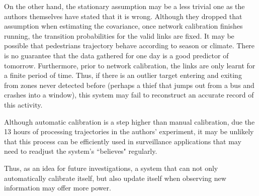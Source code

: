 \documentclass[10pt]{article}
\begin{document}
On the other hand, the stationary assumption may be a less trivial one as the authors themselves have stated that it is wrong. Although they dropped that assumption when estimating the covariance, once network calibration finishes running, the transition probabilities for the valid links are fixed. It may be possible that pedestrians trajectory behave according to season or climate. There is no guarantee that the data gathered for one day is a good predictor of tomorrow. Furthermore, prior to network calibration, the links are only learnt for a finite period of time. Thus, if there is an outlier target entering and exiting from zones never detected before (perhaps a thief that jumps out from a bus and crashes into a window), this system may fail to reconstruct an accurate record of this activity.

Although automatic calibration is a step higher than manual calibration, due the 13 hours of processing trajectories in the authors' experiment, it may be unlikely that this process can be efficiently used in surveillance applications that may need to readjust the system's ``believes" regularly.  

Thus, as an idea for future investigations, a system that can not only automatically calibrate itself, but also update itself when observing new information may offer more power.
\end{document}
